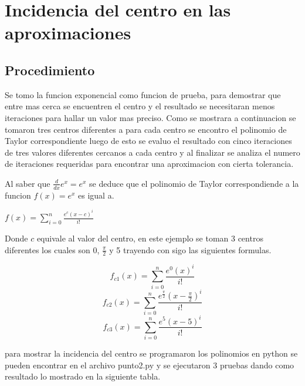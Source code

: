 \documentclass[12pt]{article}
\begin{document}
    \section{Incidencia del centro en las aproximaciones}
        \subsection{Procedimiento}
        Se tomo la funcion exponencial como funcion de prueba, para demostrar que entre mas 
        cerca se encuentren el centro y el resultado se necesitaran menos iteraciones para 
        hallar un valor mas preciso.
        Como se mostrara a continuacion se tomaron tres centros diferentes a para cada centro
        se encontro el polinomio de Taylor correspondiente luego de esto se evaluo el resultado
        con cinco iteraciones de tres valores diferentes cercanos a cada centro y al finalizar se
        analiza el numero de iteraciones requeridas para encontrar una aproximacion con cierta
        tolerancia.

        Al saber que $\frac{d}{dx} e^{x} = e^{x}$ se deduce que el polinomio de Taylor 
        correspondiende a la funcion $f(x) = e^{x}$ es igual a.
        \begin{center}
        \begin{math}
            f(x) = \sum_{i=0}^{n} \frac{e^{c}(x-c)^{i}}{i!}
        \end{math}
        \end{center}
        Donde $c$ equivale al valor del centro, en este ejemplo se toman 3 centros diferentes los
        cuales son 0, $\frac{\pi}{2}$ y 5 trayendo con sigo las siguientes formulas.
        
        \begin{equation}
            f_{c1}(x) = \sum_{i=0}^{n} \frac{e^{0}(x)^{i}}{i!}
        \end{equation}
        \begin{equation}
            f_{c2}(x) = \sum_{i=0}^{n} \frac{e^{\frac{\pi}{2}}(x-\frac{\pi}{2})^{i}}{i!}
        \end{equation}
        \begin{equation}
            f_{c3}(x) = \sum_{i=0}^{n} \frac{e^{5}(x-5)^{i}}{i!}
        \end{equation}

        para mostrar la incidencia del centro se programaron los polinomios en python se pueden
        encontrar en el archivo punto2.py y se ejecutaron 3 pruebas dando como resultado lo 
        mostrado en la siguiente tabla.
        
\end{document}
